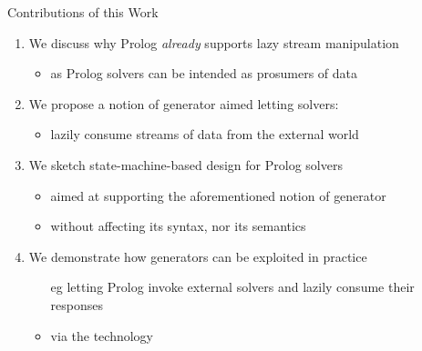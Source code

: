 \documentclass[presentation]{beamer}
\begin{document}
\begin{frame}{Contributions of this Work}

    \begin{enumerate}
        \item We discuss why Prolog \emph{already} supports lazy stream manipulation
        \begin{itemize}
            \item as Prolog solvers can be intended as \alert{prosumers} of data
        \end{itemize}
        
        \vfill
        
        \item We propose a notion of \alert{generator} aimed letting solvers:
        \begin{itemize}
            \item lazily consume streams of data from the external world
        \end{itemize}

        \vfill  
        
        \item We sketch \alert{state-machine-based} design for Prolog solvers
        \begin{itemize}
            \item aimed at supporting the aforementioned notion of \alert{generator}
            \item without affecting its syntax, nor its semantics
        \end{itemize}

        \vfill  

        \item We demonstrate how generators can be exploited in practice
        \begin{itemize}
            \item[eg] letting Prolog invoke external solvers and lazily consume their responses
            \item via the \twopkt{} technology 
        \end{itemize}
    \end{enumerate}

\end{frame}
\end{document}
